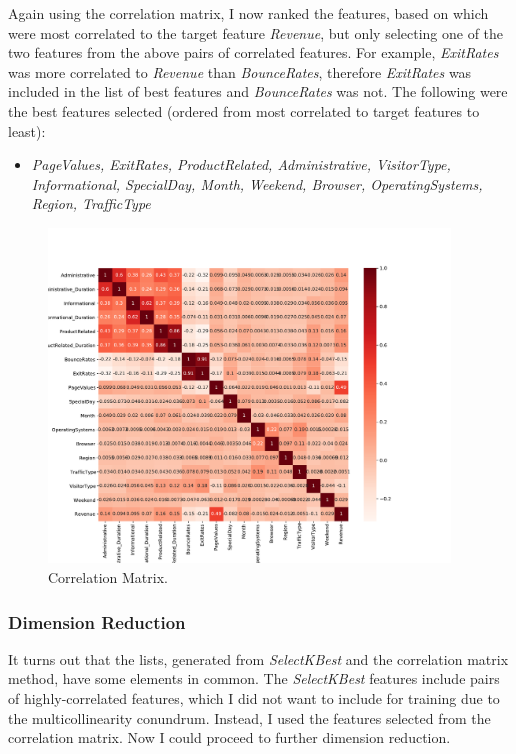 \documentclass{article}
\begin{document}
Again using the correlation matrix, I now ranked the features, based on which were most correlated to the target feature \emph{Revenue}, but only selecting one of the two features from the above pairs of correlated features. For example, \emph{ExitRates} was more correlated to \emph{Revenue} than \emph{BounceRates}, therefore \emph{ExitRates} was included in the list of best features and \emph{BounceRates} was not. The following were the best features selected (ordered from most correlated to target features to least):
\begin{itemize}
\item \emph{PageValues, ExitRates, ProductRelated, Administrative, VisitorType, Informational, SpecialDay, Month, Weekend, Browser, OperatingSystems, Region, TrafficType}
\end{itemize}

\begin{figure}[h]
\includegraphics[width=0.95\textwidth]{correlationMatrix}
\caption{Correlation Matrix.}
\label{tab:correlationMatrix}
\end{figure}

\subsubsection{Dimension Reduction}

It turns out that the lists, generated from \emph{SelectKBest} and the correlation matrix method, have some elements in common. The \emph{SelectKBest} features include pairs of highly-correlated features, which I did not want to include for training due to the multicollinearity conundrum. Instead, I used the features selected from the correlation matrix. Now I could proceed to further dimension reduction. 
\end{document}
